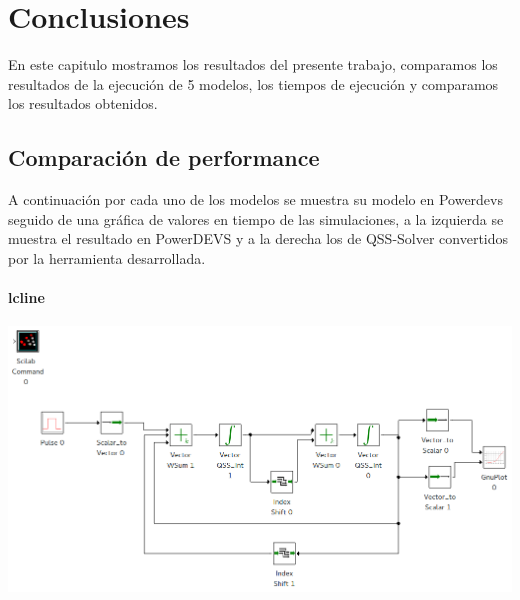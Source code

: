 \documentclass[a4paper,	11pt]{report}
\begin{document}
\chapter{Conclusiones}
En este capitulo mostramos los resultados del presente trabajo, comparamos los resultados de la ejecución de 5 modelos, los tiempos de ejecución y comparamos los resultados obtenidos.

\section{Comparación de performance}
A continuación por cada uno de los modelos se muestra su modelo en Powerdevs seguido de una gráfica de valores en tiempo de las simulaciones, a la izquierda se muestra el resultado en PowerDEVS y a la derecha los de QSS-Solver convertidos por la herramienta desarrollada.

\subsubsection{lcline}

 \includegraphics[width=0.75\linewidth]{lclines}
\end{document}
